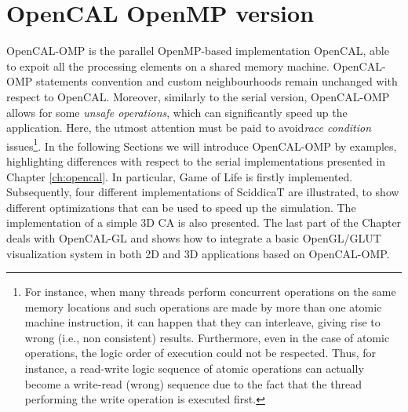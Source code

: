 \chapter{OpenCAL OpenMP version}\label{ch:opencal-omp}

OpenCAL-OMP is the parallel OpenMP-based implementation OpenCAL, able
to expoit all the processing elements on a shared memory
machine. OpenCAL-OMP statements convention and custom neighbourhoods
remain unchanged with respect to OpenCAL. Moreover, similarly to the
serial version, OpenCAL-OMP allows for some \emph{unsafe operations},
which can significantly speed up the application. Here, the utmost
attention must be paid to avoid\textsl{race condition}
issues\footnote{For instance, when many threads perform concurrent
  operations on the same memory locations and such operations are made
  by more than one atomic machine instruction, it can happen that they
  can interleave, giving rise to wrong (i.e., non consistent)
  results. Furthermore, even in the case of atomic operations, the
  logic order of execution could not be respected. Thus, for instance,
  a read-write logic sequence of atomic operations can actually become
  a write-read (wrong) sequence due to the fact that the thread
  performing the write operation is executed first.}. In the following
Sections we will introduce OpenCAL-OMP by examples, highlighting
differences with respect to the serial implementations presented in
Chapter \ref{ch:opencal}. In particular, Game of Life is firstly
implemented. Subsequently, four different implementations of SciddicaT
are illustrated, to show different optimizations that can be used to
speed up the simulation. The implementation of a simple 3D CA is also
presented. The last part of the Chapter deals with OpenCAL-GL and
shows how to integrate a basic OpenGL/GLUT visualization system in
both 2D and 3D applications based on OpenCAL-OMP.






